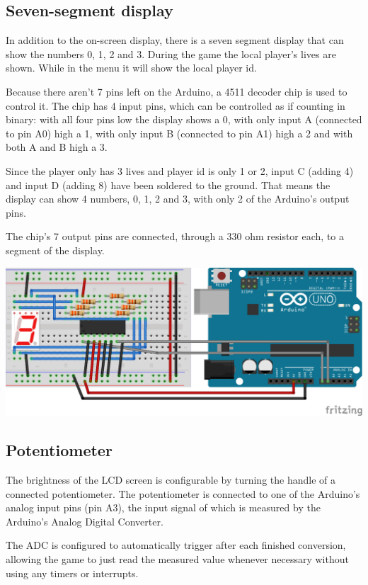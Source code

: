 \subsection{Seven-segment display}
\label{sec:seven-segment}

In addition to the on-screen display, there is a seven segment display that can
show the numbers 0, 1, 2 and 3. During the game the local player's lives are
shown. While in the menu it will show the local player id.

Because there aren’t 7 pins left on the Arduino, a 4511 decoder chip is used to
control it. The chip has 4 input pins, which can be controlled as if counting
in binary: with all four pins low the display shows a 0, with only input A
(connected to pin A0) high a 1, with only input B (connected to pin A1) high a
2 and with both A and B high a 3.

Since the player only has 3 lives and player id is only 1 or 2, input C (adding
4) and input D (adding 8) have been soldered to the ground. That means the
display can show 4 numbers, 0, 1, 2 and 3, with only 2 of the Arduino’s output
pins.

The chip’s 7 output pins are connected, through a 330 ohm resistor each, to
a segment of the display.

\includegraphics[width=\textwidth,height=\textheight,keepaspectratio]{res/seven-segment.png}

\subsection{Potentiometer}
\label{sec:potentiometer}

The brightness of the LCD screen is configurable by turning the handle of a
connected potentiometer. The potentiometer is connected to one of the Arduino's
analog input pins (pin A3), the input signal of which is measured by the
Arduino's Analog Digital Converter.

The ADC is configured to automatically trigger after each finished conversion,
allowing the game to just read the measured value whenever necessary without
using any timers or interrupts.


